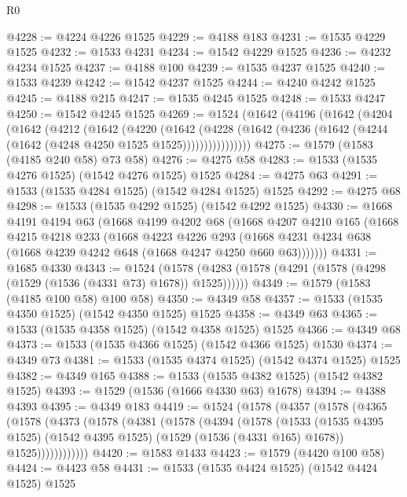 \begin{lexlean}{R0}
\begin{coremodule}
@4228 := @4224 @4226 @1525
@4229 := @4188 @183
@4231 := @1535 @4229 @1525
@4232 := @1533 @4231
@4234 := @1542 @4229 @1525
@4236 := @4232 @4234 @1525
@4237 := @4188 @100
@4239 := @1535 @4237 @1525
@4240 := @1533 @4239
@4242 := @1542 @4237 @1525
@4244 := @4240 @4242 @1525
@4245 := @4188 @215
@4247 := @1535 @4245 @1525
@4248 := @1533 @4247
@4250 := @1542 @4245 @1525
@4269 := @1524
    (@1642
      (@4196
        (@1642
          (@4204
            (@1642
              (@4212
                (@1642
                  (@4220
                    (@1642
                      (@4228
                        (@1642 (@4236 (@1642 (@4244 (@1642 (@4248 @4250 @1525 @1525))))))))))))))))
@4275 := @1579 (@1583 (@4185 @240 @58) @73 @58)
@4276 := @4275 @58
@4283 := @1533 (@1535 @4276 @1525) (@1542 @4276 @1525) @1525
@4284 := @4275 @63
@4291 := @1533 (@1535 @4284 @1525) (@1542 @4284 @1525) @1525
@4292 := @4275 @68
@4298 := @1533 (@1535 @4292 @1525) (@1542 @4292 @1525)
@4330 := @1668
    @4191
    @4194
    @63
    (@1668
      @4199
      @4202
      @68
      (@1668
        @4207
        @4210
        @165
        (@1668
          @4215
          @4218
          @233
          (@1668
            @4223
            @4226
            @293
            (@1668 @4231 @4234 @638 (@1668 @4239 @4242 @648 (@1668 @4247 @4250 @660 @63)))))))
@4331 := @1685 @4330
@4343 := @1524
    (@1578 (@4283 (@1578 (@4291 (@1578 (@4298 (@1529 (@1536 (@4331 @73) @1678)) @1525))))))
@4349 := @1579 (@1583 (@4185 @100 @58) @100 @58)
@4350 := @4349 @58
@4357 := @1533 (@1535 @4350 @1525) (@1542 @4350 @1525) @1525
@4358 := @4349 @63
@4365 := @1533 (@1535 @4358 @1525) (@1542 @4358 @1525) @1525
@4366 := @4349 @68
@4373 := @1533 (@1535 @4366 @1525) (@1542 @4366 @1525) @1530
@4374 := @4349 @73
@4381 := @1533 (@1535 @4374 @1525) (@1542 @4374 @1525) @1525
@4382 := @4349 @165
@4388 := @1533 (@1535 @4382 @1525) (@1542 @4382 @1525)
@4393 := @1529 (@1536 (@1666 @4330 @63) @1678)
@4394 := @4388 @4393
@4395 := @4349 @183
@4419 := @1524
    (@1578
      (@4357
        (@1578
          (@4365
            (@1578
              (@4373
                (@1578
                  (@4381
                    (@1578
                      (@4394
                        (@1578
                          (@1533
                            (@1535 @4395 @1525)
                            (@1542 @4395 @1525)
                            (@1529 (@1536 (@4331 @165) @1678))
                            @1525))))))))))))
@4420 := @1583 @1433
@4423 := @1579 (@4420 @100 @58)
@4424 := @4423 @58
@4431 := @1533 (@1535 @4424 @1525) (@1542 @4424 @1525) @1525

\end{coremodule}
\end{lexlean}
